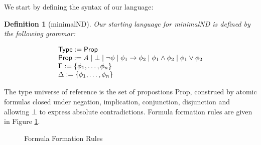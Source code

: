 \documentclass[]{article}
\newtheorem{definition}{Definition}
\begin{document}
We start by defining the syntax of our language:

\begin{definition}[{\sf minimalND}]

 Our starting language for {\sf minimalND} is defined by the following grammar:

\begin{displaymath}
\begin{array}{l}
{\sf Type}:={\sf Prop}\\
{\sf Prop}:= A \mid \bot \mid \neg \phi \mid \phi_{1} \rightarrow \phi_{2} \mid \phi_{1} \wedge \phi_{2} \mid \phi_{1} \vee \phi_{2}\\
\Gamma := \{\phi_{1}, \dots, \phi_{n}\}\\
\Delta := \{\phi_{1}, \dots, \phi_{n}\}

\end{array}
\end{displaymath}
\end{definition}

%
The type universe of reference is the set of propostions {\sf Prop}, construed by atomic formulas closed under negation, implication, conjunction, disjunction and allowing $\bot$ to express absolute contradictions. Formula formation rules are given in Figure \ref{fig:formulaconstructions}.

\begin{figure}[h!]
\caption{Formula Formation Rules}\label{fig:formulaconstructions}
\end{figure}
\end{document}
